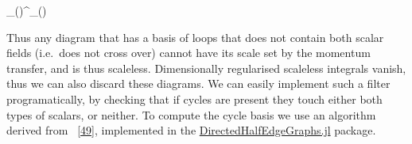 \documentclass[
  10pt,
  a4paper,
  DIV=11,
  numbers=noendperiod,
  oneside]{scrreprt}
\let\[\relax \let\]\relax %
\DeclareRobustCommand{\[}{\begin{equation}}
\DeclareRobustCommand{\]}{\end{equation}}
\begin{document}
\[
_()\lambda^\eta {}_()
\]

Thus any diagram that has a basis of loops that does not contain both
scalar fields (i.e.~does not cross over) cannot have its scale set by
the momentum transfer, and is thus scaleless. Dimensionally regularised
scaleless integrals vanish, thus we can also discard these diagrams. We
can easily implement such a filter programatically, by checking that if
cycles are present they touch either both types of scalars, or neither.
To compute the cycle basis we use an algorithm derived from
~{[}\protect\hyperlink{ref-Paton:1969}{49}{]}, implemented in the
\href{https://github.com/lcnhb/DirectedHalfEdgeGraphs.jl}{DirectedHalfEdgeGraphs.jl}
package.
\end{document}
